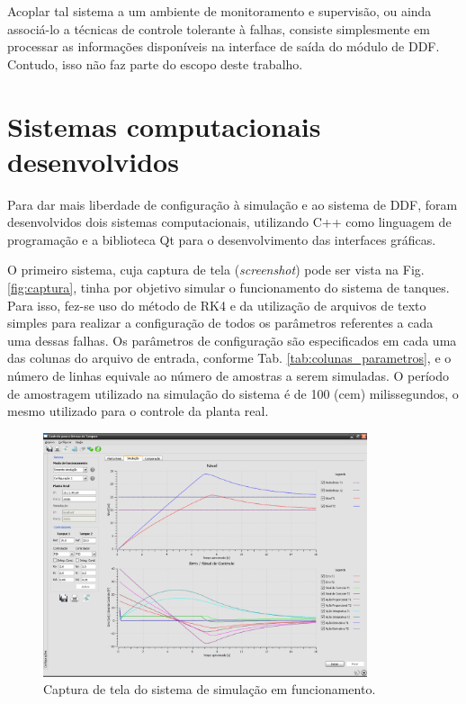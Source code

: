 Acoplar tal sistema a um ambiente de monitoramento e supervisão, ou ainda
associá-lo a técnicas de controle tolerante à falhas, consiste simplesmente em
processar as informações disponíveis na interface de saída do módulo de DDF.
Contudo, isso não faz parte do escopo deste trabalho.

\section{Sistemas computacionais desenvolvidos}
Para dar mais liberdade de configuração à simulação e ao sistema de DDF, foram
desenvolvidos dois sistemas computacionais, utilizando C++ como linguagem de
programação e a biblioteca Qt para o desenvolvimento das interfaces gráficas.

O primeiro sistema, cuja captura de tela ({\it screenshot}) pode ser vista na
Fig. \ref{fig:captura}, tinha por objetivo simular o funcionamento do sistema de
tanques. Para isso, fez-se uso do método de RK4 e da utilização de arquivos de
texto simples para realizar a configuração de todos os parâmetros referentes a
cada uma dessas falhas. Os parâmetros de configuração são especificados em cada
uma das colunas do arquivo de entrada, conforme Tab.
\ref{tab:colunas_parametros}, e o número de linhas equivale ao número de
amostras a serem simuladas. O período de amostragem utilizado na simulação do
sistema é de 100 (cem) milissegundos, o mesmo utilizado para o controle da
planta real.

\begin{figure}[!htb]
\centering
    \includegraphics[width=0.85\textwidth]{imgs/sistema/eps/captura_simulador}
    \caption{Captura de tela do sistema de simulação em funcionamento.}
    \label{fig:captura_simulador}
\end{figure}


